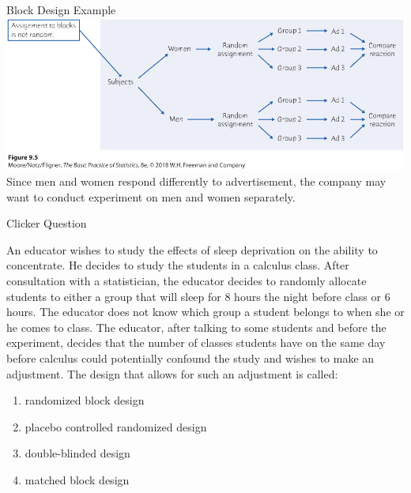 \documentclass{beamer}
\begin{document}
\begin{frame}{Block Design Example}
	\includegraphics[width=\textwidth]{block_design}
	Since men and women respond differently to advertisement, the company may want to conduct experiment on men and women separately.
\end{frame}

\begin{frame}{Clicker Question}
	\small{An educator wishes to study the effects of sleep deprivation on the ability to concentrate. He decides to study the students in a calculus class. After consultation with a statistician, the educator decides to randomly allocate students to either a group that will sleep for 8 hours the night before class or 6 hours. The educator does not know which group a student belongs to when she or he comes to class. The educator, after talking to some students and before the experiment, decides that the number of classes students have on the same day before calculus could potentially confound the study and wishes to make an adjustment. The design that allows for such an adjustment is called:
		\begin{enumerate}[label=(\alph*)]
			\item randomized block design
			\item placebo controlled randomized design
			\item double-blinded design
			\item matched block design
		\end{enumerate}}
\end{frame}
\end{document}
